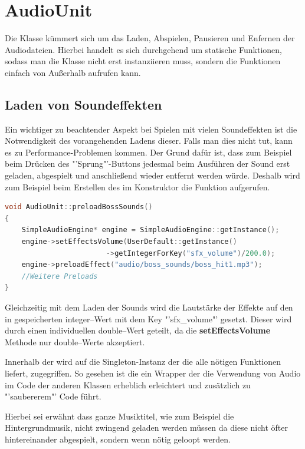 \section{AudioUnit}\label{sec:4_Audiounit}
Die Klasse  kümmert sich um das Laden, Abspielen, Pausieren und Enfernen der Audiodateien. Hierbei handelt es sich durchgehend um statische Funktionen, sodass man die Klasse nicht erst instanziieren muss, sondern die Funktionen einfach von Außerhalb aufrufen kann.

\subsection{Laden von Soundeffekten}
Ein wichtiger zu beachtender Aspekt bei Spielen mit vielen Soundeffekten ist die Notwendigkeit des vorangehenden Ladens dieser. Falls man dies nicht tut, kann es zu Performance-Problemen kommen. Der Grund dafür ist, dass zum Beispiel beim Drücken des "'Sprung"'-Buttons jedesmal beim Ausführen der Sound erst geladen, abgespielt und anschließend wieder entfernt werden würde. Deshalb wird zum Beispiel beim Erstellen des  im Konstruktor die Funktion  aufgerufen.

\begin{lstlisting}[label=lst:preloadBossSounds,
				   language=C++,
				   firstnumber=30,
				   caption=BossLevel-Sounds laden ( AudioUnit.cpp )]
void AudioUnit::preloadBossSounds()
{
	SimpleAudioEngine* engine = SimpleAudioEngine::getInstance();
	engine->setEffectsVolume(UserDefault::getInstance()
						->getIntegerForKey("sfx_volume")/200.0);
	engine->preloadEffect("audio/boss_sounds/boss_hit1.mp3");
	//Weitere Preloads
}
\end{lstlisting}

Gleichzeitig mit dem Laden der Sounds wird die Lautstärke der Effekte auf den in  gespeicherten integer--Wert mit dem Key "'sfx\_volume"' gesetzt. Dieser wird durch einen individuellen double--Wert geteilt, da die \textbf{setEffectsVolume} Methode nur double--Werte akzeptiert.

Innerhalb der  wird auf die Singleton-Instanz der  die alle nötigen Funktionen liefert, zugegriffen. So gesehen ist die  ein Wrapper der die Verwendung von Audio im Code der anderen Klassen erheblich erleichtert und zusätzlich zu "'saubererem"' Code führt. 

Hierbei sei erwähnt dass ganze Musiktitel, wie zum Beispiel die Hintergrundmusik, nicht zwingend geladen werden müssen da diese nicht öfter hintereinander abgespielt, sondern wenn nötig geloopt werden. 

